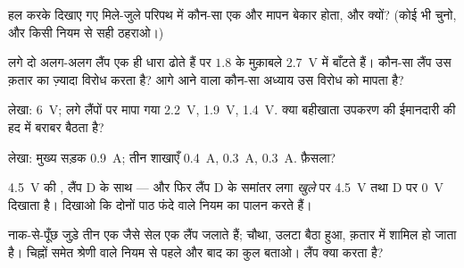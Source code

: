 \begin{exercise}[$\star$]\label{exo:g8:circuit-laws:5}
हल करके दिखाए गए मिले-जुले परिपथ में कौन-सा एक और मापन बेकार होता,
और क्यों? (कोई भी चुनो, और किसी नियम से सही ठहराओ।)
\end{exercise}

\begin{exercise}[$\star$]\label{exo:g8:circuit-laws:6}
 लगे दो अलग-अलग लैंप एक ही धारा ढोते हैं पर  $1.8$
के मुक़ाबले \qty{2.7}{V} में बाँटते हैं। कौन-सा लैंप उस क़तार का
ज़्यादा विरोध करता है? आगे आने वाला कौन-सा अध्याय उस विरोध को मापता
है?
\end{exercise}

\begin{exercise}[$\star$]\label{exo:g8:circuit-laws:7}
लेखा:  \qty{6}{V};  लगे लैंपों पर मापा गया
\qty{2.2}{V}, \qty{1.9}{V}, \qty{1.4}{V}. क्या बहीखाता उपकरण की
ईमानदारी की हद में बराबर बैठता है?
\end{exercise}

\begin{exercise}[$\star$]\label{exo:g8:circuit-laws:8}
लेखा: मुख्य सड़क \qty{0.9}{A}; तीन शाखाएँ \qty{0.4}{A},
\qty{0.3}{A}, \qty{0.3}{A}. फ़ैसला?
\end{exercise}

\begin{exercise}[$\star\star$]\label{exo:g8:circuit-laws:9}
\qty{4.5}{V} की , लैंप D  के साथ  --- और फिर लैंप
D के समांतर लगा  \emph{खुले}  पर \qty{4.5}{V} तथा D पर
\qty{0}{V} दिखाता है। दिखाओ कि दोनों पाठ फंदे वाले  नियम का
पालन करते हैं।
\end{exercise}

\begin{exercise}[$\star\star$]\label{exo:g8:circuit-laws:10}
नाक-से-पूँछ जुड़े तीन एक जैसे सेल एक लैंप जलाते हैं; चौथा, उलटा बैठा
हुआ, क़तार में शामिल हो जाता है। चिह्नों समेत श्रेणी वाले नियम से पहले
और बाद का कुल  बताओ। लैंप क्या करता है?
\end{exercise}

